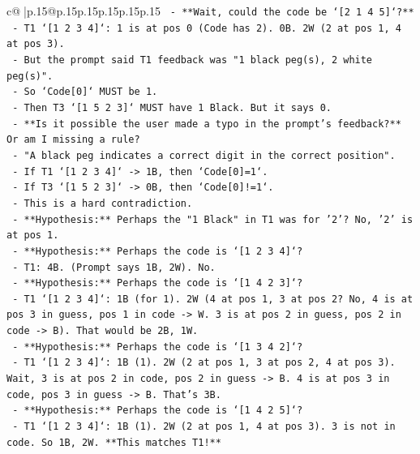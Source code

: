 \documentclass{article}
\begin{document}
{\begin{supertabular}{c@{$\;$}|p{.15\linewidth}@{}p{.15\linewidth}p{.15\linewidth}p{.15\linewidth}p{.15\linewidth}p{.15\linewidth}}
{{{\texttt{            {-} **Wait, could the code be `{[}2 1 4 5{]}`?**} \\
\texttt{              {-} T1 `{[}1 2 3 4{]}`: 1 is at pos 0 (Code has 2). 0B. 2W (2 at pos 1, 4 at pos 3).} \\
\texttt{              {-} But the prompt said T1 feedback was "1 black peg(s), 2 white peg(s)".} \\
\texttt{              {-} So `Code{[}0{]}` MUST be 1.} \\
\texttt{              {-} Then T3 `{[}1 5 2 3{]}` MUST have 1 Black. But it says 0.} \\
\texttt{              {-} **Is it possible the user made a typo in the prompt's feedback?** Or am I missing a rule?} \\
\texttt{              {-} "A black peg indicates a correct digit in the correct position".} \\
\texttt{              {-} If T1 `{[}1 2 3 4{]}` {-}> 1B, then `Code{[}0{]}=1`.} \\
\texttt{              {-} If T3 `{[}1 5 2 3{]}` {-}> 0B, then `Code{[}0{]}!=1`.} \\
\texttt{              {-} This is a hard contradiction.} \\
\texttt{              {-} **Hypothesis:** Perhaps the "1 Black" in T1 was for '2'? No, '2' is at pos 1.} \\
\texttt{              {-} **Hypothesis:** Perhaps the code is `{[}1 2 3 4{]}`?} \\
\texttt{                {-} T1: 4B. (Prompt says 1B, 2W). No.} \\
\texttt{              {-} **Hypothesis:** Perhaps the code is `{[}1 4 2 3{]}`?} \\
\texttt{                {-} T1 `{[}1 2 3 4{]}`: 1B (for 1). 2W (4 at pos 1, 3 at pos 2? No, 4 is at pos 3 in guess, pos 1 in code {-}> W. 3 is at pos 2 in guess, pos 2 in code {-}> B). That would be 2B, 1W.} \\
\texttt{              {-} **Hypothesis:** Perhaps the code is `{[}1 3 4 2{]}`?} \\
\texttt{                {-} T1 `{[}1 2 3 4{]}`: 1B (1). 2W (2 at pos 1, 3 at pos 2, 4 at pos 3). Wait, 3 is at pos 2 in code, pos 2 in guess {-}> B. 4 is at pos 3 in code, pos 3 in guess {-}> B. That's 3B.} \\
\texttt{              {-} **Hypothesis:** Perhaps the code is `{[}1 4 2 5{]}`?} \\
\texttt{                {-} T1 `{[}1 2 3 4{]}`: 1B (1). 2W (2 at pos 1, 4 at pos 3). 3 is not in code. So 1B, 2W. **This matches T1!**} \\
}}}
\end{supertabular}}
\end{document}
